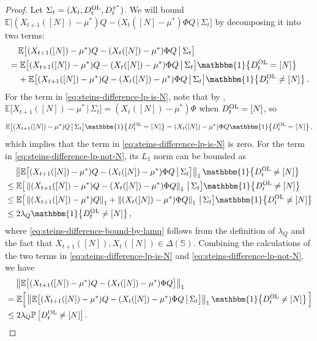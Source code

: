 \documentclass[11pt,letterpaper]{article}
\theoremstyle{plain}
\theoremstyle{definition}
\theoremstyle{remark}
\newcommand{\norm}[1]{\left\lVert#1\right\rVert}
\newcommand{\Ebig}[1]{\mathbb{E}\big[#1\big]}
\newcommand{\EBig}[1]{\mathbb{E}\Big[#1\Big]}
\newcommand{\givenbig}{\,\big|\,}
\newcommand{\Prob}[1]{\mathbb{P}\left[#1\right]}
\newcommand{\indibrac}[1]{\mathbbm{1}\!\left\{#1\right\}}
\newcommand{\sspa}{\mathbb{S}}
\newcommand{\pibar}{{\sysbar{\pi}}}
\newcommand{\pibs}{{\pibar^*}}
\newcommand{\sysbar}[1]{\bar{#1}}
\newcommand{\statdist}{\mu^*}
\newcommand{\Da}{D^{\pibs}}
\newcommand{\Db}{D^{\textup{OL}}}
\newcommand{\Fullstate}{\Sigma}
\newcommand{\lamq}{\lambda_{Q}}
\begin{document}
\begin{proof}
    Let $\Fullstate_t = (X_t, \Db_t, \Da_t)$. 
    We will bound $\Ebig{(X_{t+1}([N])-\statdist)Q - (X_t([N]-\statdist)\Phi Q \givenbig \Fullstate_t}$ by decomposing it into two terms: 
    \begin{align}
        \nonumber
        &\mspace{20mu} \Ebig{(X_{t+1}([N])-\statdist)Q - (X_t([N])-\statdist)\Phi Q \givenbig \Fullstate_t} \\
        \label{eq:steins-difference-lp-is-N}
        &= \Ebig{(X_{t+1}([N])-\statdist)Q - (X_t([N])-\statdist)\Phi Q  \givenbig \Fullstate_t} \indibrac{\Db_t = [N]}\\
        \label{eq:steins-difference-lp-not-N}
        &\mspace{20mu} + \Ebig{(X_{t+1}([N])-\statdist)Q - (X_t([N])-\statdist)\Phi Q  \givenbig \Fullstate_t} \indibrac{\Db_t \neq [N]}.
    \end{align}
    For the term in \eqref{eq:steins-difference-lp-is-N}, note that by , $\Ebig{X_{t+1}([N]) -\statdist \givenbig \Fullstate_t} = (X_t([N])-\statdist)\Phi$ when $\Db_t = [N]$, so 
    \begin{equation*}
        \Ebig{(X_{t+1}([N])-\statdist)Q \givenbig \Fullstate_t}  \indibrac{\Db_t = [N]}  
        = (X_t([N])-\statdist)\Phi Q \indibrac{\Db_t = [N]}, 
    \end{equation*}
    which implies that the term in \eqref{eq:steins-difference-lp-is-N} is zero. For the term in \eqref{eq:steins-difference-lp-not-N}, its $L_1$ norm can be bounded as 
    \begin{align}
        \nonumber
         &\mspace{20mu} \norm{\Ebig{(X_{t+1}([N])-\statdist)Q - (X_t([N])-\statdist)\Phi Q  \givenbig \Fullstate_t}}_1 \indibrac{\Db_t \neq [N]} \\
         \nonumber
         &\leq  \Ebig{\norm{(X_{t+1}([N])-\statdist)Q - (X_t([N])-\statdist)\Phi Q}_1  \givenbig \Fullstate_t} \indibrac{\Db_t \neq [N]} \\
         \nonumber
         &\leq \Ebig{\norm{(X_{t+1}([N])-\statdist)Q}_1 + \norm{(X_t([N])-\statdist)\Phi Q}_1  \givenbig \Fullstate_t} \indibrac{\Db_t \neq [N]}  \\
         \label{eq:steins-difference-bound-by-lamq}
        &\leq 2\lamq \indibrac{\Db_t \neq [N]},
    \end{align}
    where \eqref{eq:steins-difference-bound-by-lamq} follows from the definition of $\lamq$ and the fact that $X_{t+1}([N]), X_t([N]) \in \Delta(\sspa)$. 
    Combining the calculations of the two terms in \eqref{eq:steins-difference-lp-is-N} and \eqref{eq:steins-difference-lp-not-N}, we have
    \begin{align}
        \nonumber
         &\mspace{20mu} \norm{\Ebig{(X_{t+1}([N])-\statdist)Q - (X_t([N])-\statdist)\Phi Q}}_1 \\ 
         \nonumber
         &=   \EBig{ \norm{\Ebig{(X_{t+1}([N])-\statdist)Q - (X_t([N])-\statdist)\Phi Q  \givenbig \Fullstate_t}}_1 \indibrac{\Db_t \neq [N]} }  \\
         \label{eq:two-set:steins-diff-expect-ell1-bound}
         &\leq 2\lamq \Prob{\Db_t \neq [N]}.
    \end{align}


\end{proof}
\end{document}
